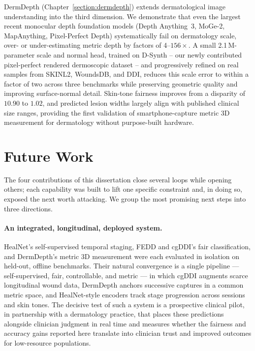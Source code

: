 \documentclass[11pt]{ucthesis}
\begin{document}
DermDepth (Chapter~\ref{section:dermdepth}) extends dermatological image understanding into the third dimension. We demonstrate that even the largest recent monocular depth foundation models (Depth Anything~3, MoGe-2, MapAnything, Pixel-Perfect Depth) systematically fail on dermatology scale, over- or under-estimating metric depth by factors of 4--$156\times$. A small 2.1\,M-parameter scale and normal head, trained on D-Synth -- our newly contributed pixel-perfect rendered dermoscopic dataset -- and progressively refined on real samples from SKINL2, WoundsDB, and DDI, reduces this scale error to within a factor of two across three benchmarks while preserving geometric quality and improving surface-normal detail. Skin-tone fairness improves from a disparity of $10.90$ to $1.02$, and predicted lesion widths largely align with published clinical size ranges, providing the first validation of smartphone-capture metric 3D measurement for dermatology without purpose-built hardware.

\section{Future Work}

 
The four contributions of this dissertation close several loops while opening others; each capability was built to lift one specific constraint and, in doing so, exposed the next worth attacking. We group the most promising next steps into three directions.

\paragraph{An integrated, longitudinal, deployed system.}
HealNet's self-supervised temporal staging, FEDD and cgDDI's fair classification, and DermDepth's metric 3D measurement were each evaluated in isolation on held-out, offline benchmarks. Their natural convergence is a single pipeline --- self-supervised, fair, controllable, and metric --- in which cgDDI augments scarce longitudinal wound data, DermDepth anchors successive captures in a common metric space, and HealNet-style encoders track stage progression across sessions and skin tones. The decisive test of such a system is a prospective clinical pilot, in partnership with a dermatology practice, that places these predictions alongside clinician judgment in real time and measures whether the fairness and accuracy gains reported here translate into clinician trust and improved outcomes for low-resource populations.
\end{document}
